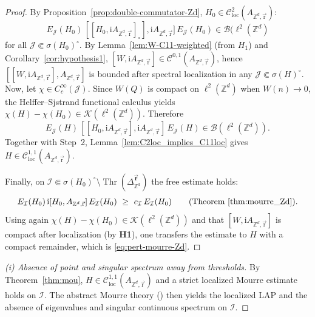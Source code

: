 \documentclass[10pt]{amsart} %
\newcommand{\Z}{{\mathbb{Z}}}
\newcommand{\1}{{\mathbb{I}}}
\newcommand{\Thr}{\operatorname{Thr}}
\numberwithin{equation}{section}
\begin{document}
\begin{proof}

By Proposition~\ref{prop:double-commutator-Zd}, $H_0\in\mathcal{C}^2_{\mathrm{loc}}(A_{\mathbb{Z}^d,\vec{\mathrm{r}}})$:
\[
E_\mathcal{J}(H_0)\,[[H_0,\mathrm{i}A_{\mathbb{Z}^d,\vec{\mathrm{r}}}]_{\circ}],\mathrm{i}A_{\mathbb{Z}^d,\vec{\mathrm{r}}}
]\,E_\mathcal{J}(H_0)\in\mathcal{B}(\ell^2(\Z^d)
\]
for all $\mathcal{J}\Subset\sigma(H_0)^\circ$.
By Lemma~\ref{lem:W-C11-weighted} (from \textbf{$H_1$}) and Corollary~\ref{cor:hypothesis1},
$[W,\mathrm{i}A_{\mathbb{Z}^d,\vec{\mathrm{r}}}]\in\mathcal{C}^{0,1}(A_{\mathbb{Z}^d,\vec{\mathrm{r}}})$, hence $[[W,\mathrm{i}A_{\mathbb{Z}^d,\vec{\mathrm{r}}}],A_{\mathbb{Z}^d,\vec{\mathrm{r}}}]$ is bounded after spectral localization in any $\mathcal{J}\Subset\sigma(H)^\circ$.\\


Now, let $\chi\in C_c^\infty(\mathcal{J})$. Since $W(Q)$ is compact on $\ell^2(\mathbb{Z}^d)$ when $W(n)\to0$, the Helffer--Sjstrand functional calculus yields $\chi(H)-\chi(H_0)\in\mathcal{K}(\ell^2(\Z^d))$. Therefore
\[
E_\mathcal{J}(H)\,[[H_0,\mathrm{i}A_{\mathbb{Z}^d,\vec{\mathrm{r}}}],\mathrm{i}A_{\mathbb{Z}^d,\vec{\mathrm{r}}}]\,E_\mathcal{J}(H)\in\mathcal{B}(\ell^2(\Z^d)).
\]
Together with Step~2, Lemma~\ref{lem:C2loc_implies_C11loc} gives $H\in\mathcal{C}^{1,1}_{\mathrm{loc}}(A_{\mathbb{Z}^d,\vec{\mathrm{r}}})$.

Finally, on $\mathcal{I}\Subset\sigma(H_0)^\circ\setminus\Thr(\Delta_{\mathbb{Z}^d}^{\vec{\mathbf{r}}})$ the free estimate holds:
\[
E_\mathcal{I}(H_0)\,\mathrm{i}[H_0,A_{\mathbb{Z}^d,\vec{\mathrm{r}}}]\,E_\mathcal{I}(H_0)\ \ge\ c_{\mathcal{I}}\,E_\mathcal{I}(H_0)
\qquad\text{(Theorem \ref{thm:mourre_Zd})}.
\]
Using again $\chi(H)-\chi(H_0)\in\mathcal{K}(\ell^2(\Z^d))$ and that $[W,\mathrm{i}A_{\mathbb{Z}^d,\vec{\mathrm{r}}}]$ is compact after localization (by \textbf{H1}), one transfers the estimate to $H$ with a compact remainder, which is \eqref{eq:pert-mourre-Zd}.
\end{proof}


\begin{proof}[(i) Absence of point and singular spectrum away from thresholds]
By Theorem~\ref{thm:mou}, $H\in\mathcal{C}^{1,1}_{\mathrm{loc}}(A_{\mathbb{Z}^d,\vec{\mathrm{r}}})$ and a strict localized Mourre estimate holds on $\mathcal{I}$. The abstract Mourre theory (\cite[Thms.~7.4.1-7.4.2]{ABG}) then yields the localized LAP and the absence of eigenvalues and singular continuous spectrum on $\mathcal{I}$.
\end{proof}
\end{document}
